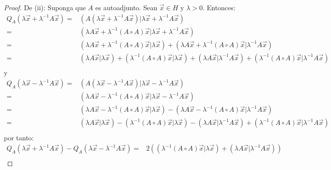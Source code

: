 \documentclass[12pt]{report}
\theoremstyle{largebreak}
\newcommand\pint[2]{\ensuremath{\left(#1\big|#2\right)}}
\begin{document}
\begin{proof}
        De (ii): Suponga que $A$ es autoadjunto. Sean $\vec{x}\in H$ y $\lambda>0$. Entonces:
        \begin{equation*}
            \begin{split}
                Q_A(\lambda\vec{x}+\lambda^{-1}A\vec{x})=&\pint{A(\lambda\vec{x}+\lambda^{-1}A\vec{x})}{\lambda\vec{x}+\lambda^{-1}A\vec{x}} \\
                =&\pint{\lambda A\vec{x}+\lambda^{-1}(A\circ A)\vec{x}}{\lambda\vec{x}+\lambda^{-1}A\vec{x}} \\
                =&\pint{\lambda A\vec{x}+\lambda^{-1}(A\circ A)\vec{x}}{\lambda\vec{x}}+\pint{\lambda A\vec{x}+\lambda^{-1}(A\circ A)\vec{x}}{\lambda^{-1}A\vec{x}}\\
                =&\pint{\lambda A\vec{x}}{\lambda\vec{x}}+\pint{\lambda^{-1}(A\circ A)\vec{x}}{\lambda\vec{x}}+\pint{\lambda A\vec{x}}{\lambda^{-1}A\vec{x}}+\pint{\lambda^{-1}(A\circ A)\vec{x}}{\lambda^{-1}A\vec{x}}\\
            \end{split}
        \end{equation*}
        y
        \begin{equation*}
            \begin{split}
                Q_A(\lambda\vec{x}-\lambda^{-1}A\vec{x})=&\pint{A(\lambda\vec{x}-\lambda^{-1}A\vec{x})}{\lambda\vec{x}-\lambda^{-1}A\vec{x}} \\
                =&\pint{\lambda A\vec{x}-\lambda^{-1}(A\circ A)\vec{x}}{\lambda\vec{x}-\lambda^{-1}A\vec{x}} \\
                =&\pint{\lambda A\vec{x}-\lambda^{-1}(A\circ A)\vec{x}}{\lambda\vec{x}}-\pint{\lambda A\vec{x}-\lambda^{-1}(A\circ A)\vec{x}}{\lambda^{-1}A\vec{x}}\\
                =&\pint{\lambda A\vec{x}}{\lambda\vec{x}}-\pint{\lambda^{-1}(A\circ A)\vec{x}}{\lambda\vec{x}}-\pint{\lambda A\vec{x}}{\lambda^{-1}A\vec{x}}+\pint{\lambda^{-1}(A\circ A)\vec{x}}{\lambda^{-1}A\vec{x}}\\
            \end{split}
        \end{equation*}
        por tanto:
        \begin{equation*}
            \begin{split}
                Q_A(\lambda\vec{x}+\lambda^{-1}A\vec{x})-Q_A(\lambda\vec{x}-\lambda^{-1}A\vec{x})=&2(\pint{\lambda^{-1}(A\circ A)\vec{x}}{\lambda\vec{x}}+\pint{\lambda A\vec{x}}{\lambda^{-1}A\vec{x}})\\

\end{split}
\end{equation*}
\end{proof}
\end{document}
